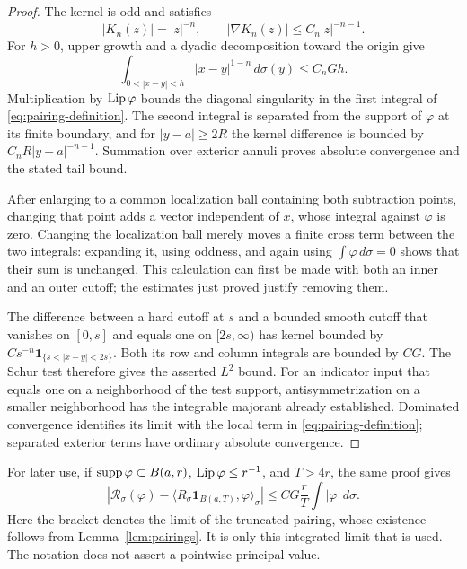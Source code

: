 \begin{proof}
The kernel is odd and satisfies
\[
 |K_n(z)|=|z|^{-n},\qquad |\nabla K_n(z)|\le C_n|z|^{-n-1}.
\]
For $h>0$, upper growth and a dyadic decomposition toward the origin
give
\begin{equation}\label{eq:near-growth-integral}
 \int_{0<|x-y|<h}|x-y|^{1-n}\,d\sigma(y)\le C_n G h.
\end{equation}
Multiplication by $\operatorname{Lip}\varphi$ bounds the diagonal singularity in
the first integral of \eqref{eq:pairing-definition}. The second
integral is separated from the support of $\varphi$ at its finite
boundary, and for $|y-a|\ge2R$ the kernel difference is bounded by
$C_nR|y-a|^{-n-1}$. Summation over exterior annuli proves absolute
convergence and the stated tail bound.

After enlarging to a common localization ball containing both
subtraction points, changing that point adds a vector independent of $x$,
whose integral against $\varphi$ is zero. Changing the localization
ball merely moves a finite cross term between the two integrals:
expanding it, using oddness, and again using $\int\varphi\,d\sigma=0$
shows that their sum is unchanged. This calculation can first be
made with both an inner and an outer cutoff; the estimates just proved
justify removing them.

The difference between a hard cutoff at $s$ and a bounded smooth
cutoff that vanishes on $[0,s]$ and equals one on $[2s,\infty)$ has
kernel bounded by $C s^{-n}\mathbf1_{\{s<|x-y|<2s\}}$.
Both its row and column integrals are bounded by $CG$. The Schur test
therefore gives the asserted $L^2$ bound. For an indicator input that
equals one on a neighborhood of the test support, antisymmetrization
on a smaller neighborhood has
the integrable majorant already established. Dominated convergence
identifies its limit with the local term in
\eqref{eq:pairing-definition}; separated exterior terms have ordinary
absolute convergence.
\end{proof}

For later use, if $\operatorname{supp}\varphi\subset B(a,r)$,
$\operatorname{Lip}\varphi\le r^{-1}$, and $T>4r$, the same proof gives
\begin{equation}\label{eq:localized-pairing-tail}
 \left|\mathcal R_\sigma(\varphi)
       -\langle R_\sigma\mathbf1_{B(a,T)},\varphi\rangle_\sigma\right|
 \le C G\frac rT\int|\varphi|\,d\sigma.
\end{equation}
Here the bracket denotes the limit of the truncated pairing, whose
existence follows from Lemma~\ref{lem:pairings}. It is only this
integrated limit that is used. The notation does not assert a
pointwise principal value.

